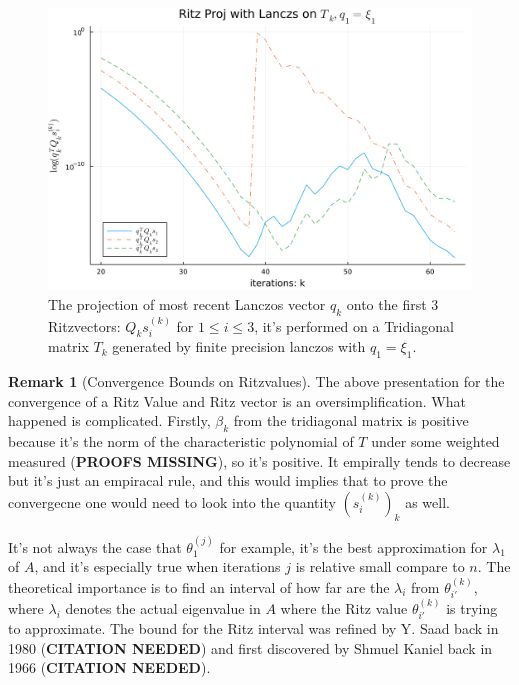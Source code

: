 \documentclass[]{article}
\theoremstyle{definition}
\newtheorem{remark}{Remark}[subsection]  %
\begin{document}
            \begin{figure}[H]
                \centering 
                \includegraphics[width=14cm]{ritz_proj_tridiagonal.png}
                \caption{The projection of most recent Lanczos vector $q_k$ onto the first 3 Ritzvectors: $Q_ks_i^{(k)}$ for $1\le i \le 3$, it's performed on a Tridiagonal matrix $T_k$ generated by finite precision lanczos with $q_1 = \xi_1$. }
            \end{figure}\label{fig:6}
            \begin{remark}[Convergence Bounds on Ritzvalues]
                The above presentation for the convergence of a Ritz Value and Ritz vector is an oversimplification. What happened is complicated. Firstly, $\beta_k$ from the tridiagonal matrix is positive because it's the norm of the characteristic polynomial of $T$ under some weighted measured (\textbf{PROOFS MISSING}), so it's positive. It empirally tends to decrease but it's just an empiracal rule, and this would implies that to prove the convergecne one would need to look into the quantity $(s_i^{(k)})_k$ as well. 
                \par
                It's not always the case that $\theta_1^{(j)}$ for example, it's the best approximation for $\lambda_1$ of $A$, and it's especially true when iterations $j$ is relative small compare to $n$. The theoretical importance is to find an interval of how far are the $\lambda_i$ from $\theta_{i'}^{(k)}$, where $\lambda_i$ denotes the actual eigenvalue in $A$ where the Ritz value $\theta_{i'}^{(k)}$ is trying to approximate. The bound for the Ritz interval was refined by Y. Saad back in 1980 (\textbf{CITATION NEEDED}) and first discovered by Shmuel Kaniel back in 1966 (\textbf{CITATION NEEDED}). 
            \end{remark}
\end{document}
